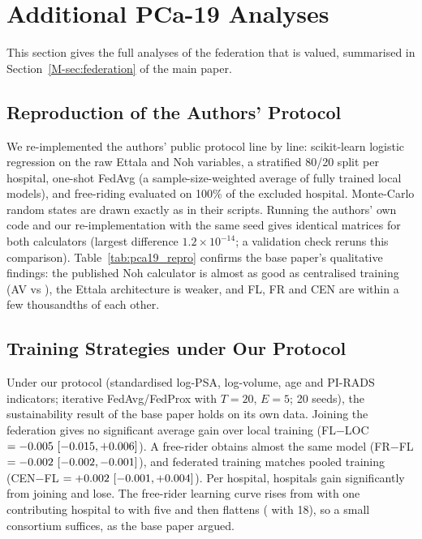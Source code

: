\section{Additional PCa-19 Analyses}
\label{sec:pca19_more}
This section gives the full analyses of the federation that is valued, summarised in Section~\ref{M-sec:federation} of the main paper.

\subsection{Reproduction of the Authors' Protocol}
\label{sec:p19_repro}
We re-implemented the authors' public protocol line by line: scikit-learn logistic regression on the raw Ettala and Noh variables, a stratified 80/20 split per hospital, one-shot FedAvg (a sample-size-weighted average of fully trained local models), and free-riding evaluated on 100\% of the excluded hospital. Monte-Carlo random states are drawn exactly as in their scripts. Running the authors' own code and our re-implementation with the same seed gives identical matrices for both calculators (largest difference $1.2\times10^{-14}$; a validation check reruns this comparison). Table~\ref{tab:pca19_repro} confirms the base paper's qualitative findings: the published Noh calculator is almost as good as centralised training (AV \pRepNohBL{} vs \pRepNohCEN{}), the Ettala architecture is weaker, and FL, FR and CEN are within a few thousandths of each other.



\subsection{Training Strategies under Our Protocol}
Under our protocol (standardised log-PSA, log-volume, age and PI-RADS indicators; iterative FedAvg/FedProx with $T=20$, $E=5$; 20 seeds), the sustainability result of the base paper holds on its own data. Joining the federation gives no significant average gain over local training (FL$-$LOC $=-0.005\ [-0.015, +0.006]$). A free-rider obtains almost the same model (FR$-$FL $=-0.002\ [-0.002, -0.001]$), and federated training matches pooled training (CEN$-$FL $=+0.002\ [-0.001, +0.004]$). Per hospital, \pGainSig{} hospitals gain significantly from joining and \pLossSig{} lose. The free-rider learning curve rises from \pLcFrOne{} with one contributing hospital to \pLcFrFive{} with five and then flattens (\pLcFrLast{} with 18), so a small consortium suffices, as the base paper argued.

